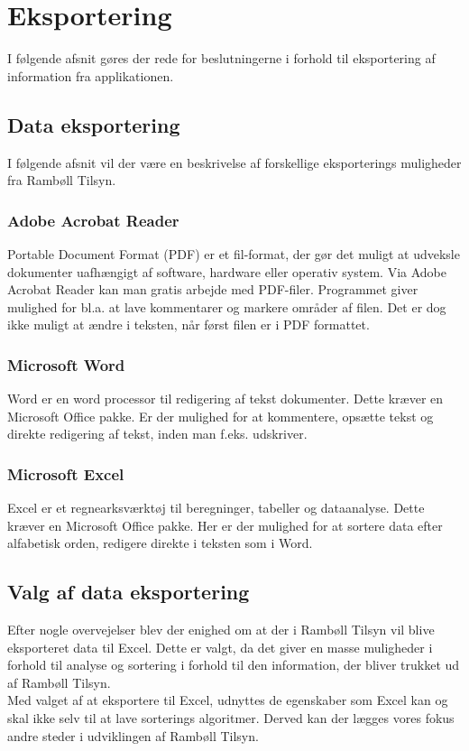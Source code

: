 \section{Eksportering}                                   
I følgende afsnit gøres der rede for beslutningerne i forhold til eksportering af information fra applikationen.

\subsection{Data eksportering}
I følgende afsnit vil der være en beskrivelse af forskellige eksporterings muligheder fra Rambøll Tilsyn.

\subsubsection{Adobe Acrobat Reader}
Portable Document Format\cite{PDF} (PDF) er et fil-format, der gør det muligt at udveksle dokumenter uafhængigt af software, hardware eller operativ system.
Via Adobe Acrobat Reader\cite{AdobeReader} kan man gratis arbejde med PDF-filer. Programmet giver mulighed for bl.a. at lave kommentarer og markere områder af filen. Det er dog ikke muligt at ændre i teksten, når først filen er i PDF formattet.

\subsubsection{Microsoft Word}
Word\cite{Office} er en word processor\cite{WordProcessor} til redigering af tekst dokumenter.
Dette kræver en Microsoft Office pakke. Er der mulighed for at kommentere, opsætte tekst og direkte redigering af tekst, inden man f.eks. udskriver.

\subsubsection{Microsoft Excel}
Excel\cite{Office} er et regnearksværktøj til beregninger, tabeller og dataanalyse. 
Dette kræver en Microsoft Office pakke. Her er der mulighed for at sortere data efter alfabetisk orden, redigere direkte i teksten som i Word.

\subsection{Valg af data eksportering}
Efter nogle overvejelser blev der enighed om at der i Rambøll Tilsyn vil blive eksporteret data til Excel. Dette er valgt, da det giver en masse muligheder i forhold til analyse og sortering i forhold til den information, der bliver trukket ud af Rambøll Tilsyn. \\
Med valget af at eksportere til Excel, udnyttes de egenskaber som Excel kan og skal ikke selv til at lave sorterings algoritmer. Derved kan der lægges vores fokus andre steder i udviklingen af Rambøll Tilsyn.